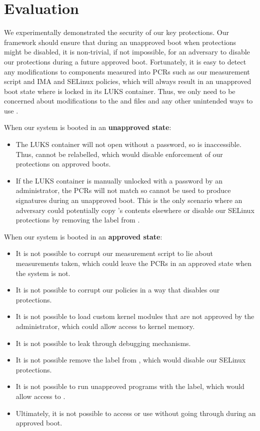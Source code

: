 \documentclass[12pt,letterpaper]{kuthesis}
\begin{document}
\section{Evaluation}\label{sec:evaluation}
We experimentally demonstrated the security of our key protections.
Our framework should ensure that during an unapproved boot when protections might be disabled,
it is non-trivial, if not impossible, for an adversary to disable our protections during a future approved boot.
Fortunately, it is easy to detect any modifications to components measured into PCRs such as our measurement script and IMA and SELinux policies,
which will always result in an unapproved boot state where \wcp is locked in its LUKS container.
Thus, we only need to be concerned about modifications to the \tpmsign and \wcp files
and any other unintended ways to use \pk.

When our system is booted in an \textbf{unapproved state}:
        \begin{itemize}
          \item The LUKS container will not open without a password, so \wcp is inaccessible.
                Thus, \wcp cannot be relabelled, which would disable enforcement of our protections on approved boots.
          \item If the LUKS container is manually unlocked with a password by an administrator,
          the PCRs will not match \wcp so \pk cannot be used to produce signatures during an unapproved boot.
          This is the only scenario where an adversary could potentially copy \wcp's contents elsewhere or
          disable our SELinux protections by removing the \filet label from \wcp.
        \end{itemize}

When our system is booted in an \textbf{approved state}:
        \begin{itemize}
          \item It is not possible to corrupt our measurement script to lie about measurements taken,
          which could leave the PCRs in an approved state when the system is not.
          \item It is not possible to corrupt our policies in a way that disables our protections.
          \item It is not possible to load custom kernel modules that are not approved by the administrator,
          which could allow access to kernel memory.
          \item It is not possible to leak \wcp through debugging mechanisms.
          \item It is not possible remove the \filet label from \wcp,
          which would disable our SELinux protections.
          \item It is not possible to run unapproved programs with the \exect label,
          which would allow access to \wcp.
          \item Ultimately, it is not possible to access \wcp or use \pk without going through \tpmsign during an approved boot.
        \end{itemize}
\end{document}
